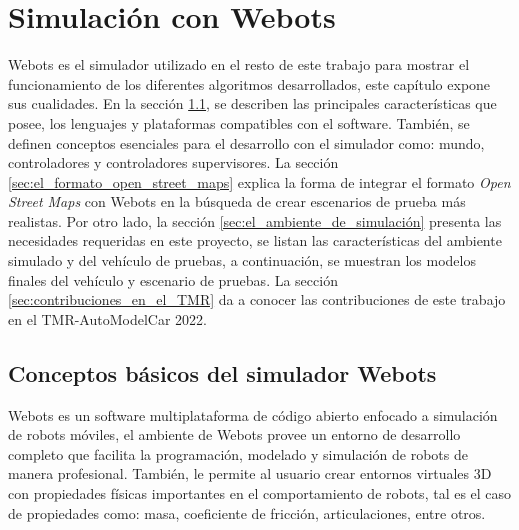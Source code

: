 \chapter{Simulación con Webots} \label{cap:simulación_con_webots}
Webots es el simulador utilizado en el resto de este trabajo para mostrar el funcionamiento de los diferentes algoritmos desarrollados, este capítulo expone sus cualidades. En la sección \ref{sec:conceptos_básicos_del_simulador_Webots}, se describen las principales características que posee, los lenguajes y plataformas compatibles con el software. También, se definen conceptos esenciales para el desarrollo con el simulador como: mundo, controladores y controladores supervisores. La sección \ref{sec:el_formato_open_street_maps} explica la forma de integrar el formato \textit{Open Street Maps} con Webots en la búsqueda de crear escenarios de prueba más realistas. Por otro lado, la sección \ref{sec:el_ambiente_de_simulación} presenta las necesidades requeridas en este proyecto, se listan las características del ambiente simulado y del vehículo de pruebas, a continuación, se muestran los modelos finales del vehículo y escenario de pruebas. La sección \ref{sec:contribuciones_en_el_TMR} da a conocer las contribuciones de este trabajo en el TMR-AutoModelCar 2022.


\section{Conceptos básicos del simulador Webots} \label{sec:conceptos_básicos_del_simulador_Webots}

Webots es un software multiplataforma de código abierto enfocado a simulación de robots móviles, el ambiente de Webots provee un entorno de desarrollo completo que facilita la programación, modelado y simulación de robots de manera profesional. También, le permite al usuario crear entornos virtuales 3D con propiedades físicas importantes en el comportamiento de robots, tal es el caso de propiedades como: masa, coeficiente de fricción, articulaciones, entre otros\cite{Webots}.


